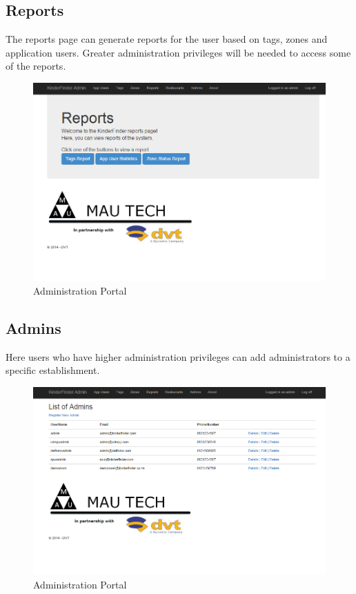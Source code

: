 \documentclass{article}
\begin{document}
\subsection{Reports}
The reports page can generate reports for the user based on tags, zones and application users. Greater administration privileges will be needed to access some of the reports.
\begin{figure}[H]
\centering
\includegraphics[scale=0.4]{adminportalreports.png}
\caption{Administration Portal}
\end{figure}

\subsection{Admins}
Here users who have higher administration privileges can add administrators to a specific establishment.
\begin{figure}[H]
\centering
\includegraphics[scale=0.4]{adminportal3listofadmins.png}
\caption{Administration Portal}
\end{figure}
\end{document}
